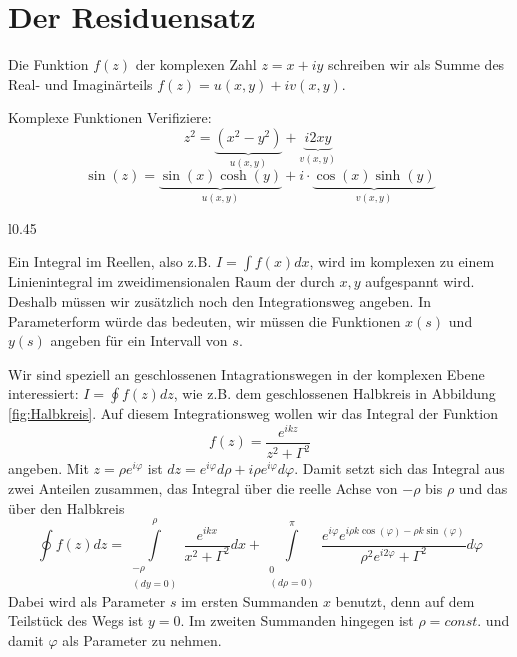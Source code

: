 \chapter{Der Residuensatz}\label{sec:Residuensatz}
Die Funktion $f(z)$ der komplexen Zahl $z=x+iy$ schreiben wir als Summe des
Real- und Imaginärteils $f(z)=u(x,y)+iv(x,y)$.
\begin{example}{Komplexe Funktionen}
  Verifiziere:
  \[ z^2=\underbrace{(x^2-y^2)}_{u(x,y)}+\underbrace{i2xy}_{v(x,y)}\]
  \[\sin(z)=\underbrace{\sin(x)\cosh(y)}_{u(x,y)}+i\cdot\underbrace{\cos(x)\sinh(y)}_{v(x,y)}\]
\end{example}

\begin{wrapfigure}[12]{l}{0.45\textwidth}
 \begin{center}
  \caption{Integrationsweg in der komplexen Ebene.\label{fig:Halbkreis}}
 \end{center}
\end{wrapfigure}
Ein Integral im Reellen, also z.B. $I=\int f(x)dx$, wird im komplexen zu einem
Linienintegral im zweidimensionalen Raum der durch $x,y$ aufgespannt wird.
Deshalb müssen wir zusätzlich noch den Integrationsweg angeben. In
Parameterform würde das bedeuten, wir müssen die Funktionen $x(s)$ und $y(s)$
angeben für ein Intervall von $s$.

Wir sind speziell an geschlossenen Intagrationswegen in der komplexen Ebene interessiert:
$I=\oint f(z)dz$, wie z.B. dem geschlossenen Halbkreis in Abbildung
\ref{fig:Halbkreis}. Auf diesem Integrationsweg wollen wir das Integral der Funktion
\[f(z)=\frac{e^{ikz}}{z^2+\Gamma^2}\]
angeben. Mit $z=\rho e^{i\varphi}$ ist $dz=e^{i\varphi}d\rho+i\rho
e^{i\varphi}d\varphi$.  Damit setzt sich das Integral aus zwei Anteilen
zusammen, das Integral über die reelle Achse von $-\rho$ bis $\rho$ und das
über den Halbkreis
\[\oint f(z)dz=\int\limits_{\substack{-\rho\\ (dy=0)}}^{\rho}\frac{e^{ikx}}{x^2+\Gamma^2}dx+
  \int\limits_{\substack{0\\(d\rho=0)}}^{\pi}\frac{e^{i\varphi}
  e^{i\rho k\cos(\varphi)-\rho k\sin(\varphi)}}{\rho^2e^{i2\varphi}+\Gamma^2}d\varphi
\]
Dabei wird als Parameter $s$ im ersten Summanden $x$ benutzt, denn auf dem
Teilstück des Wegs ist $y=0$. Im zweiten Summanden hingegen ist $\rho=const.$
und damit $\varphi$ als Parameter zu nehmen.

